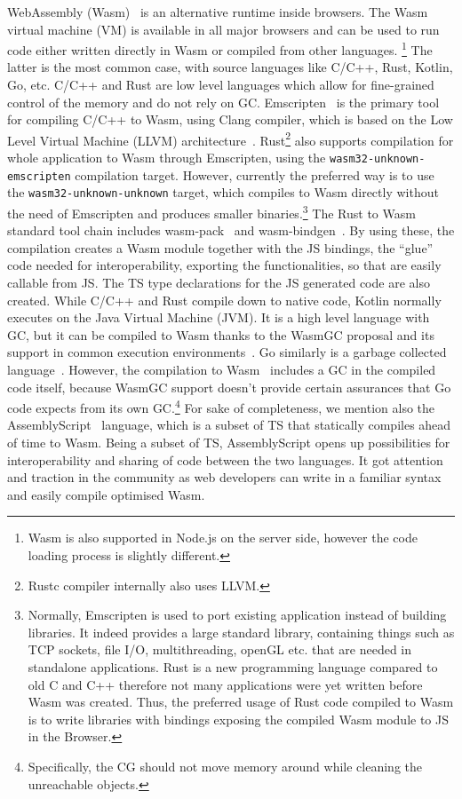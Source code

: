 WebAssembly (Wasm)~\cite{Haas2017,WasmSpecification} is an alternative runtime
inside browsers.
The Wasm virtual machine (VM) is available in all major
browsers and can be used to run code either written directly in Wasm
or compiled from other languages.
\footnote{Wasm is also supported in Node.js on the server side, however the
code loading process is slightly different.} 
The latter is the
most common case, with source languages like C/C++, Rust,
Kotlin, Go, etc. C/C++ and Rust are low level languages
which allow for fine-grained control of the memory
and do not rely on GC. Emscripten~\cite{Zakai2011} is the primary 
tool for compiling C/C++ to Wasm, using Clang compiler,
which is based on the Low Level Virtual Machine
(LLVM) architecture~\cite{LLVM2004}.
Rust\footnote{Rustc compiler internally also uses LLVM.} also supports compilation for whole application to Wasm
through Emscripten, using the \texttt{wasm32-unknown-emscripten}
compilation target.
However, currently the preferred way is to use
the \texttt{wasm32-unknown-unknown} target, which
compiles to Wasm directly without the need of Emscripten
and produces smaller binaries.\footnote{Normally,
Emscripten is used to port existing application instead 
of building libraries. It indeed 
provides a large standard library, 
containing things such as TCP sockets, 
file I/O, multithreading, openGL etc. that are needed in
standalone applications.
Rust is a new programming language compared to
old C and C++ therefore not many applications were yet 
written before Wasm was created. 
Thus, the preferred usage of Rust code compiled to Wasm
is to write libraries with bindings exposing the
compiled Wasm module to JS in the Browser.}
The Rust to Wasm standard tool chain includes 
wasm-pack~\cite{WasmPack} and wasm-bindgen~\cite{WasmBindgen}.
By using these, the compilation creates a Wasm 
module together with the JS bindings, the ``glue'' code
needed for interoperability, exporting the functionalities, 
so that are easily callable from JS. The TS type declarations 
for the JS generated code are also created.
While C/C++ and Rust compile down to native code, Kotlin normally executes on the
Java Virtual Machine (JVM). It is a high level language with GC,
but it can be compiled to Wasm thanks to the WasmGC proposal
and its support in common execution environments~\cite{WasmGCProposal, WasmGCinV8}.
Go similarly is a garbage collected language~\cite{GoGarbageCollector}.
However, the compilation to Wasm~\cite{GOWasm} 
includes a GC in the compiled code itself, because WasmGC support doesn't
provide certain assurances that Go code expects from its own GC.\footnote{Specifically, the CG should not move memory around while cleaning the unreachable objects.}
For sake of completeness, we mention also the AssemblyScript~\cite{AssemblyScript} language, 
which is a subset of TS that statically compiles ahead of time to Wasm.
Being a subset of TS, AssemblyScript opens up possibilities for
interoperability and sharing of code between the two languages.
It got attention and traction in the community as web developers 
can write in a familiar syntax and easily compile optimised Wasm.

